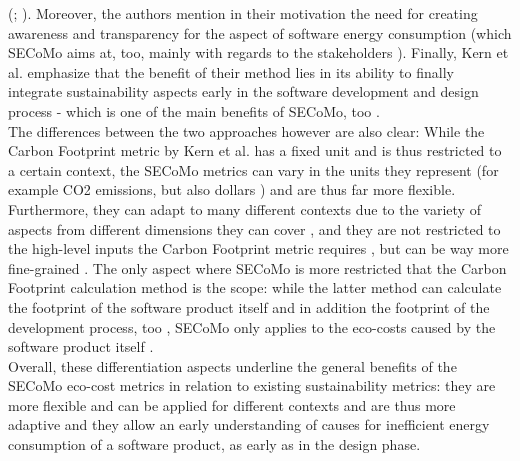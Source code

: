 \documentclass[oribibl]{llncs}
\begin{document}
(\cite{kern_impacts_2015}; \cite{schulze_cost_2016}). Moreover, the authors mention in their motivation the need for creating awareness and transparency for the aspect of software energy consumption \cite{kern_impacts_2015} (which SECoMo aims at, too, mainly with regards to the stakeholders \cite{schulze_cost_2016}). Finally, Kern et al. emphasize that the benefit of their method lies in its ability to finally integrate sustainability aspects early in the software development and design process %
\cite{kern_impacts_2015} - which is one of the main benefits of SECoMo, too \cite{schulze_cost_2016}.\\ %
The differences between the two approaches however are also clear: While the Carbon Footprint metric by Kern et al. has a fixed unit and is thus restricted to a certain context, the SECoMo metrics can vary in the units they represent (for example CO2 %
emissions, but also dollars \cite{schulze_cost_2016}) and are thus far more flexible. Furthermore, they can adapt to many different contexts due to the variety of aspects from different dimensions they can cover \cite{schulze_cost_2016}, and they are not restricted to the high-level inputs the Carbon Footprint metric requires \cite{kern_impacts_2015}, but can be way more fine-grained \cite{schulze_cost_2016}. The only aspect where SECoMo is more restricted that the Carbon Footprint calculation method is the scope: while the latter method can calculate the footprint of the software product itself and in addition the footprint of the development process, too \cite{kern_impacts_2015}, SECoMo only applies to the eco-costs caused by the software product itself \cite{schulze_cost_2016}. %
\\ Overall, these differentiation aspects underline the general benefits of the SECoMo eco-cost metrics in relation to existing sustainability metrics: they are more flexible and can be applied for different contexts and are  thus more adaptive and they allow an early understanding of causes for inefficient energy consumption of a software product, as early as in the design phase. %
\end{document}

